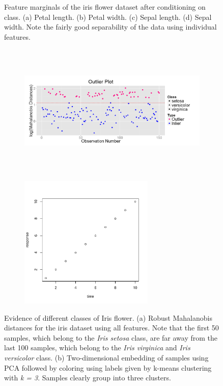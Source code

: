 \documentclass[12pt]{article}
\begin{document}
\begin{figure}
\begin{subfigure}[b]{0.8\textwidth}
		\subcaption{}
	\end{subfigure}
	\caption{Feature marginals of the iris flower dataset after conditioning on class. (a) Petal length. (b) Petal width. (c) Sepal length. (d) Sepal width. Note the fairly good separability of the data using individual features.}
	\label{fig:IrisMarginals}
\end{figure}

\begin{figure}[t]
	\centering
	\begin{subfigure}[b]{0.80\textwidth}
		\includegraphics[width=\textwidth, height = 2.5in]{Figures/Iris/OutliersIris.png}
		\subcaption{}
		\label{fig:IrisOutliers}
	\end{subfigure}	
	\begin{subfigure}[b]{0.80\textwidth}
		\includegraphics[width=\textwidth, height = 2.5in]{fig1.pdf}
		\subcaption{}
		\label{fig:IrisEmbedding}
	\end{subfigure}
	\caption{Evidence of different classes of Iris flower. (a) Robust Mahalanobis distances for the iris dataset using all features. Note that the first 50 samples, which belong to the \textit{Iris setosa} class, are far away from the last 100 samples, which belong to the \textit{Iris virginica} and \textit{Iris versicolor} class. (b) Two-dimensional embedding of samples using PCA followed by coloring using labels given by k-means clustering with \textit{k = 3}. Samples clearly group into three clusters.}
\end{figure}
\end{document}
